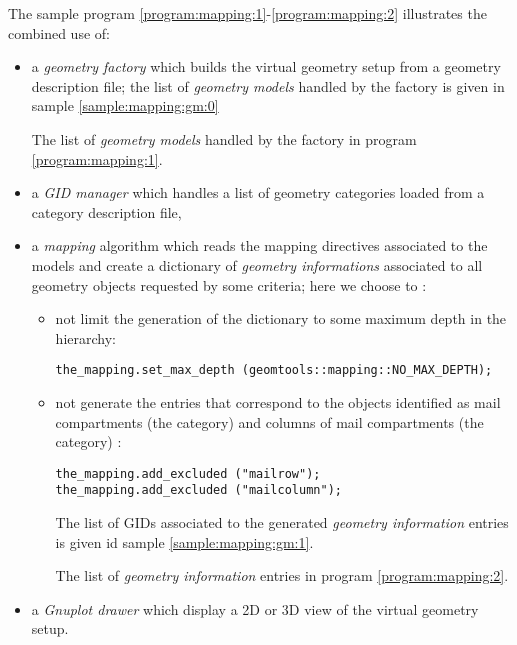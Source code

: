 The   sample  program  \ref{program:mapping:1}-\ref{program:mapping:2}
illustrates the combined use of:
\begin{itemize}

\item  a \emph{geometry  factory}  which builds  the virtual  geometry
  setup from  a geometry description file; the  list of \emph{geometry
    models}   handled   by   the    factory   is   given   in   sample
  \ref{sample:mapping:gm:0}

\begin{sample}[h]
\caption{The list of \emph{geometry  models} handled by the factory in
  program \ref{program:mapping:1}.}
\label{sample:mapping:gm:0}
\end{sample}

\item a \emph{GID manager} which handles a list of geometry categories
  loaded from a category description file,

\item a  \emph{mapping} algorithm  which reads the  mapping directives
  associated to  the models and create a  dictionary of \emph{geometry
    informations} associated to all geometry objects requested by some
  criteria; here we choose to :
  \begin{itemize}
    \item not limit  the generation of the dictionary  to some maximum
      depth in the hierarchy:
      \begin{verbatim}
the_mapping.set_max_depth (geomtools::mapping::NO_MAX_DEPTH);
      \end{verbatim}
    \item  not generate  the entries  that correspond  to  the objects
      identified as mail  compartments (the  category) and
      columns of mail compartments (the  category) :
     \begin{verbatim}
the_mapping.add_excluded ("mailrow");
the_mapping.add_excluded ("mailcolumn");
      \end{verbatim}

     The  list  of GIDs  associated  to  the generated  \emph{geometry
       information}      entries      is      given     id      sample
     \ref{sample:mapping:gm:1}.

     \begin{sample}[h]
       \caption{The  list of \emph{geometry
           information} entries   in program \ref{program:mapping:2}.}
       \label{sample:mapping:gm:1}
     \end{sample}

  \end{itemize}
 

\item a \emph{Gnuplot drawer} which display a 2D or 3D view of the virtual
  geometry setup.

\end{itemize}
\clearpage


